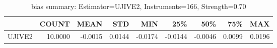 \begin{table}[ht]
\centering
\caption{bias summary: Estimator=UJIVE2, Instruments=166, Strength=0.70}
\begin{tabular}{lrrrrrrrr}
\toprule
 & COUNT & MEAN & STD & MIN & 25\% & 50\% & 75\% & MAX \\
\midrule
UJIVE2 & 10.0000 & -0.0015 & 0.0144 & -0.0174 & -0.0144 & -0.0046 & 0.0099 & 0.0196 \\
\bottomrule
\end{tabular}
\end{table}
